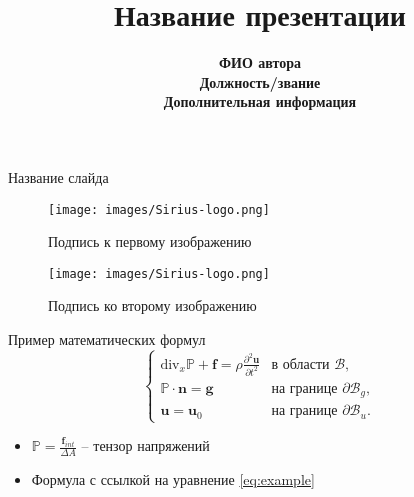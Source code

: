 \documentclass[10pt]{beamer}  %
\title[Краткий заголовок]{\bf 
Название презентации}  %
\date[]{}  %
\author[Автор] {\bf 
ФИО автора \\ 
Должность/звание \\ 
Дополнительная информация}
\institute[] {
НТУ <<Сириус>> \\ 
Название направления \\ 
Название лаборатории
}
\newcommand{\bP}{\mathbb{P}}
\begin{document}
\maketitle

\begin{frame}{Название слайда}

\begin{figure}
    \begin{minipage}{0.45\textwidth}
        \centering
        \texttt{[image: images/Sirius-logo.png]}
        \caption{Подпись к первому изображению}
    \end{minipage}
    \hfill
    \begin{minipage}{0.45\textwidth}
        \centering
        \texttt{[image: images/Sirius-logo.png]}
        \caption{Подпись ко второму изображению}
    \end{minipage}
\end{figure}

\end{frame}

\begin{frame}{Пример математических формул}
    \begin{equation}
        \label{eq:example}
        \begin{cases}
             \text{div}_x \bP + \boldsymbol{f} = \rho \frac{\partial^2 \boldsymbol{u}}{\partial t^2}  & \text{в области } \mathcal{B}, \\
            \bP \cdot \boldsymbol{n} = \boldsymbol{g} & \text{на границе } \partial \mathcal{B}_g, \\
            \boldsymbol{u} = \boldsymbol{u}_0 & \text{на границе } \partial \mathcal{B}_u.
        \end{cases}
    \end{equation}
    
    \begin{itemize}
        \item $\displaystyle \bP = \frac{\boldsymbol{f}_{int}}{\Delta A}$ -- тензор напряжений
        \item Формула с ссылкой на уравнение \eqref{eq:example}
    \end{itemize}
\end{frame}
\end{document}
